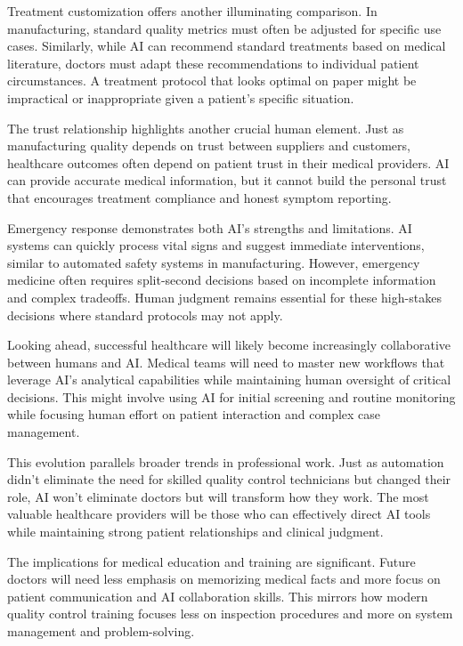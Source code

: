 \documentclass[
  Letterpaper,
]{scrbook}
\begin{document}
Treatment customization offers another illuminating comparison. In
manufacturing, standard quality metrics must often be adjusted for
specific use cases. Similarly, while AI can recommend standard
treatments based on medical literature, doctors must adapt these
recommendations to individual patient circumstances. A treatment
protocol that looks optimal on paper might be impractical or
inappropriate given a patient's specific situation.

The trust relationship highlights another crucial human element. Just as
manufacturing quality depends on trust between suppliers and customers,
healthcare outcomes often depend on patient trust in their medical
providers. AI can provide accurate medical information, but it cannot
build the personal trust that encourages treatment compliance and honest
symptom reporting.

Emergency response demonstrates both AI's strengths and limitations. AI
systems can quickly process vital signs and suggest immediate
interventions, similar to automated safety systems in manufacturing.
However, emergency medicine often requires split-second decisions based
on incomplete information and complex tradeoffs. Human judgment remains
essential for these high-stakes decisions where standard protocols may
not apply.

Looking ahead, successful healthcare will likely become increasingly
collaborative between humans and AI. Medical teams will need to master
new workflows that leverage AI's analytical capabilities while
maintaining human oversight of critical decisions. This might involve
using AI for initial screening and routine monitoring while focusing
human effort on patient interaction and complex case management.

This evolution parallels broader trends in professional work. Just as
automation didn't eliminate the need for skilled quality control
technicians but changed their role, AI won't eliminate doctors but will
transform how they work. The most valuable healthcare providers will be
those who can effectively direct AI tools while maintaining strong
patient relationships and clinical judgment.

The implications for medical education and training are significant.
Future doctors will need less emphasis on memorizing medical facts and
more focus on patient communication and AI collaboration skills. This
mirrors how modern quality control training focuses less on inspection
procedures and more on system management and problem-solving.
\end{document}
